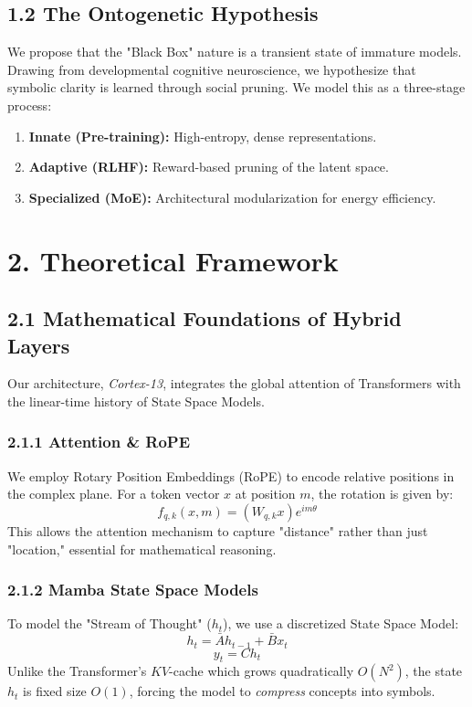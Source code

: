 \documentclass[12pt, a4paper]{article}
\begin{document}
\subsection{1.2 The Ontogenetic Hypothesis}
We propose that the "Black Box" nature is a transient state of immature models. Drawing from developmental cognitive neuroscience, we hypothesize that symbolic clarity is learned through social pruning. We model this as a three-stage process:
\begin{enumerate}
    \item \textbf{Innate (Pre-training):} High-entropy, dense representations.
    \item \textbf{Adaptive (RLHF):} Reward-based pruning of the latent space.
    \item \textbf{Specialized (MoE):} Architectural modularization for energy efficiency.
\end{enumerate}

\section{2. Theoretical Framework}

\subsection{2.1 Mathematical Foundations of Hybrid Layers}
Our architecture, \textit{Cortex-13}, integrates the global attention of Transformers with the linear-time history of State Space Models.

\subsubsection{2.1.1 Attention & RoPE}
We employ Rotary Position Embeddings (RoPE) to encode relative positions in the complex plane. For a token vector $x$ at position $m$, the rotation is given by:
\begin{equation}
    f_{q,k}(x, m) = (W_{q,k}x) e^{im\theta}
\end{equation}
This allows the attention mechanism to capture "distance" rather than just "location," essential for mathematical reasoning.

\subsubsection{2.1.2 Mamba State Space Models}
To model the "Stream of Thought" ($h_t$), we use a discretized State Space Model:
\begin{equation}
    h_t = \bar{A}h_{t-1} + \bar{B}x_t
\end{equation}
\begin{equation}
    y_t = C h_t
\end{equation}
Unlike the Transformer's $KV$-cache which grows quadratically $O(N^2)$, the state $h_t$ is fixed size $O(1)$, forcing the model to \textit{compress} concepts into symbols.
\end{document}
